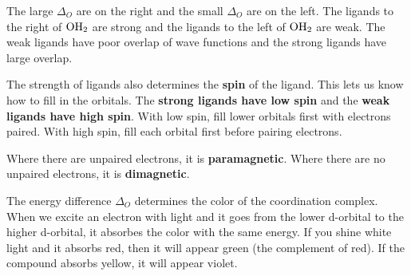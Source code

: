 \documentclass{article}
\begin{document}
The large $\Delta_{O}$ are on the right and the small $\Delta_{O}$ are on the
left. The ligands to the right of $\ce{ OH_{2} }$ are strong and the ligands to
the left of $\ce{ OH_{2} }$ are weak. The weak ligands have poor overlap of wave
functions and the strong ligands have large overlap.

The strength of ligands also determines the \textbf{spin} of the ligand. This
lets us know how to fill in the orbitals. The \textbf{strong ligands have low
spin} and the \textbf{weak ligands have high spin}. With low spin, fill lower
orbitals first with electrons paired. With high spin, fill each orbital first
before pairing electrons. 

Where there are unpaired electrons, it is \textbf{paramagnetic}. Where there
are no unpaired electrons, it is \textbf{dimagnetic}. 

The energy difference $\Delta_{O}$ determines the color of the coordination
complex. When we excite an electron with light and it goes from the lower
d-orbital to the higher d-orbital, it absorbes the color with the same energy.
If you shine white light and it absorbs red, then it will appear green (the
complement of red). If the compound absorbs yellow, it will appear violet.
\end{document}

